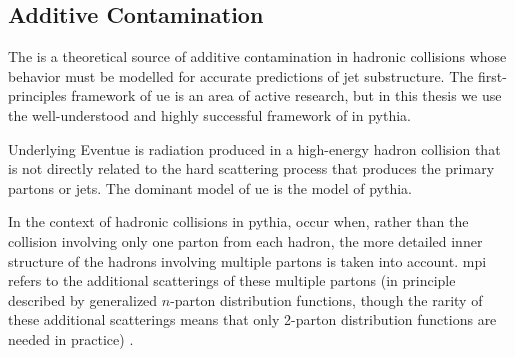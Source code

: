 \begin{subappendices}
\subsection{Additive Contamination}
\label{app:additive-contamination}


The  is a theoretical source of additive contamination in hadronic collisions whose behavior must be modelled for accurate predictions of jet substructure.
%
The first-principles framework of \gls{ue} is an area of active research, but in this thesis we use the well-understood and highly successful framework of \textit{} in \gls{pythia}.

\begin{definitionbox}{Underlying Event}{ue}
     is radiation produced in a high-energy hadron collision that is not directly related to the hard scattering process that produces the primary partons or jets.
    The dominant model of \gls{ue} is the  model of \gls{pythia}.

    In the context of hadronic collisions in \gls{pythia},  occur when, rather than the collision involving only one parton from each hadron, the more detailed inner structure of the hadrons involving multiple partons is taken into account.
    \gls{mpi} refers to the additional scatterings of these multiple partons (in principle described by generalized \(n\)-parton distribution functions, though the rarity of these additional scatterings means that only 2-parton distribution functions are needed in practice) \cite{}.
\end{definitionbox}

\begin{figure}[]
    \centering
    \caption{
    }
    \label{fig:additive-contamination-models}
\end{figure}





\end{subappendices}
